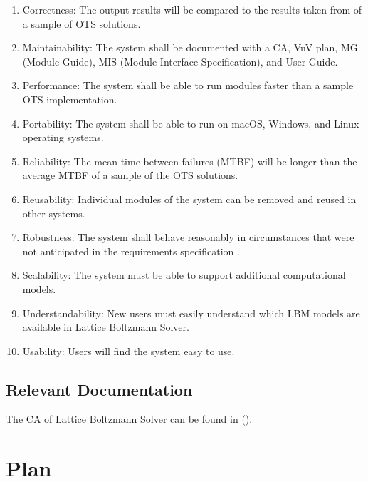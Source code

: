 \documentclass[12pt, titlepage]{article}
\newcommand{\famname}{Lattice Boltzmann Solver}
\begin{document}
\begin{enumerate}
\item Correctness: The output results will be compared to the results taken from of a sample of OTS solutions. %
\item Maintainability: The system shall be documented with a CA, VnV plan, MG
  (Module Guide), MIS (Module Interface Specification), and User Guide.
\item Performance: The system shall be able to run modules faster than a sample
  OTS implementation.
\item Portability: The system shall be able to run on macOS, Windows, and Linux
  operating systems.
\item Reliability: The mean time between failures (MTBF) will be longer than the
  average MTBF of a sample of the OTS solutions.
\item Reusability: Individual modules of the system can be removed and reused in
  other systems.
\item Robustness: The system shall behave reasonably in circumstances that were
  not anticipated in the requirements specification
  \cite{ghezzi1991fundamentals}.
\item Scalability: The system must be able to support additional computational
  models.
\item Understandability: New users must easily understand which LBM models are
  available in {\famname}.
\item Usability: Users will find the system easy to use.
\end{enumerate}

\subsection{Relevant Documentation}

The CA of {\famname} can be found in (\citet{LBM_CA_PM}).  
\newpage

\section{Plan}
\label{testplan}	
\end{document}
